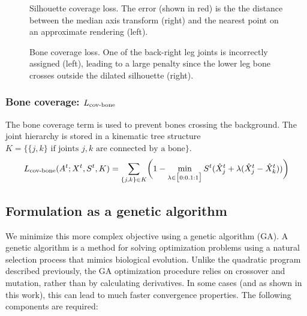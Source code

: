 \begin{figure}[t!]
\begin{floatrow}
{\caption{Silhouette coverage loss. The error (shown in red) is the the distance between the median axis transform (right) and the nearest point on an approximate rendering (left).}
\label{fig:example_errors}}
{\caption{Bone coverage loss. One of the back-right leg joints is incorrectly assigned (left), leading to a large penalty since the lower leg bone crosses outside the dilated silhouette (right).}
\label{fig:cov-bone}
}
\end{floatrow}
\end{figure}

\subsubsection{Bone coverage: $L_{\textrm{cov-bone}}$}

The bone coverage term is used to prevent bones crossing the background. The joint hierarchy is stored in a kinematic tree structure $K = \{\{j,k\} \text{ if joints } j, k \text{ are connected by a bone}\}$.
\begin{equation}
L_{\textrm{cov-bone}}(A^{t};X^{t},S^{t},K) = \sum_{\{j,k\} \in K}\biggl(1 - \min_{\lambda \in \big[0:0.1:1\big]}S^{t}(\hat{X}_{j}^{t} + \lambda(\hat{X}_{j}^{t} - \hat{X}_{k}^{t}))\biggr)
\end{equation}

\subsection{Formulation as a genetic algorithm}
We minimize this more complex objective using a genetic algorithm (GA)\cite{holland1992adaptation}. A genetic algorithm is a method for solving optimization problems using a natural selection process that mimics biological evolution. Unlike the quadratic program described previously, the GA optimization procedure relies on crossover and mutation, rather than by calculating derivatives. In some cases (and as shown in this work), this can lead to much faster convergence properties. The following components are required:

